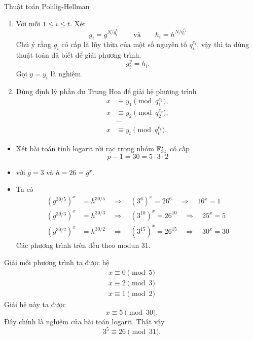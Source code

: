 \begin{frame}{Thuật toán Pohlig-Hellman}
\begin{enumerate}
	\item Với mỗi $1 \leq i \leq t$. Xét 
	\[
		g_i = g^{N/q_i^{e_i}} \qquad \text{và}\qquad h_i = h^{N/q_i^{e_i}}
	\]
	Chú ý rằng $g_i$ có cấp là lũy thừa của một số nguyên tố $q_i^{e_i}$, vậy thì ta  dùng thuật toán đã biết để giải  phương trình. 
	\[
		g_i^y = h_i.
	\]
	Gọi $y=y_i$ là nghiệm.
	\item<+-> Dùng định lý phần dư Trung Hoa để giải hệ phương trình 
          \begin{align*}
            x &\equiv y_1 \pmod{q_1^{e_1}},\\
            x &\equiv y_2 \pmod{q_2^{e_2}},\\  
              &\cdots\\ 
            x &\equiv y_t \pmod{q_t^{e_t}}.
          \end{align*}	
\end{enumerate}
\end{frame}

\begin{frame}
	\begin{xmpl}
		\begin{itemize}
			\item<+-> Xét bài toán tính logarit rời rạc trong nhóm $\mathbb{F}_{31}^*$ có cấp $$p -1 = 30 = 5\cdot 3\cdot 2 $$
			\item<+-> với $g = 3$ và $h=26 = g^x$.
			\item<+-> Ta có 
			\begin{align*}
				\left(g^{30/5}\right)^x &= h^{30/5}\quad \Rightarrow \quad (3^6)^x = 26^6 \quad \Rightarrow\quad 16^x = 1\\
				 \left(g^{30/3}\right)^x &= h^{30/3}\quad \Rightarrow\quad  (3^{10})^x = 26^{10}\quad \Rightarrow\quad 25^x = 5\\
				 \left(g^{30/2}\right)^x &= h^{30/2}\quad  \Rightarrow\quad (3^{15})^x = 26^{15}\quad \Rightarrow\quad 30^x = 30
			\end{align*} 
			Các phương trình trên đều theo modun $31$.
		\end{itemize}
	\end{xmpl}
\end{frame}
\begin{frame}
	\begin{xmpl}[tiếp]
		Giải mỗi phương trình ta được hệ 
\begin{align*}
	x \equiv 0 \pmod{5} \\
	x \equiv 2 \pmod{3}\\
	x \equiv 1 \pmod{2}
\end{align*}
Giải hệ này ta được 
\[
	x \equiv 5 \pmod{30}.
\]
Đây chính là nghiệm của bài toán logarit. Thật vậy 
\[
	3^5 \equiv 26 \pmod{31}.
\]
	\end{xmpl}
\end{frame}




